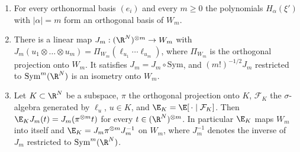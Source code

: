 \begin{lemma}\label{lem:fffock}
\begin{enumerate}[label=\textup{(\roman*)},leftmargin=*]
\item For every orthonormal basis $(e_i)$ and every $m\ge0$ the
polynomials $H_\alpha(\xi')$ with $\lvert\alpha\rvert=m$ form an orthogonal
basis of $W_m$.
\item There is a linear map $J_m:(\R^N)^{\otimes m}\to W_m$ with
$J_m(u_1\otimes\dots\otimes u_m)=\Pi_{W_m}(\ell_{u_1}\cdots\ell_{u_m})$,
where $\Pi_{W_m}$ is the orthogonal projection onto $W_m$. It satisfies
$J_m=J_m\circ\mathrm{Sym}$, and $(m!)^{-1/2}J_m$ restricted to
$\mathrm{Sym}^m(\R^N)$ is an isometry onto $W_m$.
\item Let $K\subset\R^N$ be a subspace, $\pi$ the orthogonal projection
onto $K$, $\mathcal F_K$ the $\sigma$-algebra generated by $\ell_u$, $u\in
K$, and $\E_K=\E[\,\cdot\mid\mathcal F_K]$. Then $\E_KJ_m(t)=J_m(\pi^{\otimes
m}t)$ for every $t\in(\R^N)^{\otimes m}$. In particular $\E_K$ maps $W_m$
into itself and $\E_K=J_m\pi^{\otimes m}J_m^{-1}$ on $W_m$, where $J_m^{-1}$
denotes the inverse of $J_m$ restricted to $\mathrm{Sym}^m(\R^N)$.
\end{enumerate}
\end{lemma}

